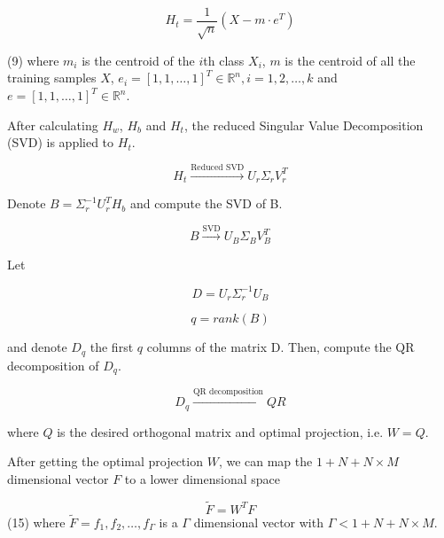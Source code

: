 \begin{equation}
H_t=\frac{1}{\sqrt{n}}(X-m\cdot e^T)
\end{equation}

(9)
where $m_i$ is the centroid of the $i$th class $X_i$, $m$ is the centroid of all the training samples $X$, $e_i=[1,1,\dots,1]^T \in \mathbb{R}^n, i=1,2,\dots,k$ and $e=[1,1,\dots,1]^T \in \mathbb{R}^n$.

After calculating $H_w$, $H_b$ and $H_t$, the reduced Singular Value Decomposition (SVD) is applied to $H_t$.

\begin{equation}
H_t \xrightarrow{\text{Reduced SVD}} U_r \Sigma_r V_r^T
\end{equation}

Denote $B=\Sigma_r^{-1} U_r^T H_b$ and compute the SVD of B.

\begin{equation}
B \xrightarrow{\text{SVD}} U_B \Sigma_B V_B^T
\end{equation}

Let

\begin{equation}
D=U_r\Sigma_r^{-1}U_B
\end{equation}

\begin{equation}
q=rank(B)
\end{equation}

and denote $D_q$ the first $q$ columns of the matrix D. Then, compute the QR decomposition of $D_q$.

\begin{equation}
D_q \xrightarrow{\text{QR decomposition}} QR
\end{equation}

where $Q$ is the desired orthogonal matrix and optimal projection, i.e. $W=Q$.

After getting the optimal projection $W$, we can map the $1+N+N\times M$ dimensional vector $F$ to a lower dimensional space

\begin{equation}
\tilde{F}=W^T F
\end{equation}
(15)
where $\tilde{F}={f_1,f_2,\dots,f_{\Gamma}}$ is a $\Gamma$ dimensional vector with $\Gamma<1+N+N\times M$.
